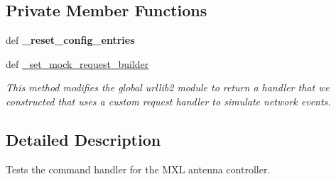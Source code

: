 \subsection*{Private Member Functions}
\begin{DoxyCompactItemize}
\item 
\hypertarget{classhwm_1_1hardware_1_1devices_1_1drivers_1_1mxl__antenna__controller_1_1tests_1_1test__mxl__anf1b82778ca0869b41ace53be3d0454a2_afa9725b4a33e1f0320ca83716d2b899c}{def {\bfseries \-\_\-reset\-\_\-config\-\_\-entries}}\label{classhwm_1_1hardware_1_1devices_1_1drivers_1_1mxl__antenna__controller_1_1tests_1_1test__mxl__anf1b82778ca0869b41ace53be3d0454a2_afa9725b4a33e1f0320ca83716d2b899c}

\item 
\hypertarget{classhwm_1_1hardware_1_1devices_1_1drivers_1_1mxl__antenna__controller_1_1tests_1_1test__mxl__anf1b82778ca0869b41ace53be3d0454a2_a73f0ff3e36b4e5fe4ff687066b5c13f0}{def \hyperlink{classhwm_1_1hardware_1_1devices_1_1drivers_1_1mxl__antenna__controller_1_1tests_1_1test__mxl__anf1b82778ca0869b41ace53be3d0454a2_a73f0ff3e36b4e5fe4ff687066b5c13f0}{\-\_\-set\-\_\-mock\-\_\-request\-\_\-builder}}\label{classhwm_1_1hardware_1_1devices_1_1drivers_1_1mxl__antenna__controller_1_1tests_1_1test__mxl__anf1b82778ca0869b41ace53be3d0454a2_a73f0ff3e36b4e5fe4ff687066b5c13f0}

\begin{DoxyCompactList}\small\item\em This method modifies the global urllib2 module to return a handler that we constructed that uses a custom request handler to simulate network events. \end{DoxyCompactList}\end{DoxyCompactItemize}


\subsection{Detailed Description}
Tests the command handler for the M\-X\-L antenna controller. 



